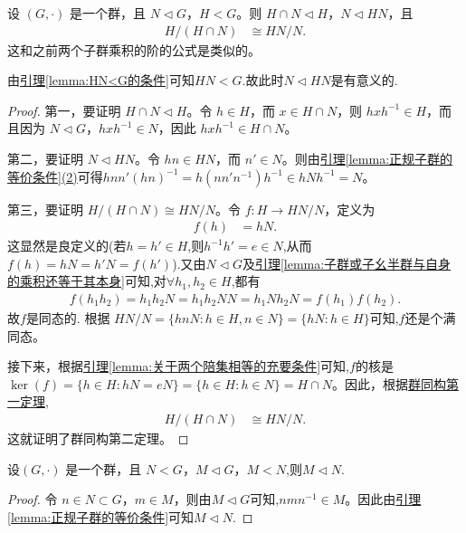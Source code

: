 \documentclass[../../main.tex]{subfiles}
\begin{document}
\begin{theorem}[群同构第二定理]\label{theorem:群同构第二定理}
设 \((G, \cdot)\) 是一个群，且 \(N \lhd G\)，\(H < G\)。则 \(H \cap N \lhd H\)，\(N \lhd HN\)，且
\begin{align*}
H/(H \cap N) &\cong HN/N .
\end{align*}
这和之前两个子群乘积的阶的公式是类似的。
\end{theorem}
\begin{remark}
由\hyperref[lemma:HN<G的条件]{引理\ref{lemma:HN<G的条件}}可知$HN<G$.故此时\(N \lhd HN\)是有意义的.
\end{remark}
\begin{proof}
第一，要证明 \(H \cap N \lhd H\)。令 \(h \in H\)，而 \(x \in H \cap N\)，则 \(hxh^{-1} \in H\)，而且因为 \(N \lhd G\)，\(hxh^{-1} \in N\)，因此 \(hxh^{-1} \in H \cap N\)。

第二，要证明 \(N \lhd HN\)。令 \(hn \in HN\)，而 \(n' \in N\)。则由\hyperref[lemma:正规子群的等价条件]{引理\ref{lemma:正规子群的等价条件}(2)}可得\(hnn'(hn)^{-1} = h(nn'n^{-1})h^{-1} \in hNh^{-1} = N\)。

第三，要证明 \(H/(H \cap N) \cong HN/N\)。令 \(f: H \to HN/N\)，定义为
\begin{align*}
f(h) &= hN .
\end{align*}
这显然是良定义的(若$h=h'\in H$,则$h^{-1}h'=e\in N$,从而$f(h)=hN=h'N=f(h')$).又由\(N \lhd G\)及\hyperref[lemma:子群或子幺半群与自身的乘积还等于其本身]{引理\ref{lemma:子群或子幺半群与自身的乘积还等于其本身}}可知,对$\forall h_1,h_2\in H$,都有
\begin{align*}
f\left( h_1h_2 \right) =h_1h_2N=h_1h_2NN=h_1Nh_2N=f\left( h_1 \right) f\left( h_2 \right) .
\end{align*}
故$f$是同态的.
根据 \(HN/N = \{hnN : h \in H, n \in N\} = \{hN : h \in H\}\)可知,$f$还是个满同态。

接下来，根据\hyperref[lemma:关于两个陪集相等的充要条件]{引理\ref{lemma:关于两个陪集相等的充要条件}}可知,$f$的核是 \(\ker(f) = \{h \in H : hN = eN\} = \{h \in H : h \in N\} = H \cap N\)。因此，根据\hyperref[theorem:群同构第一定理]{群同构第一定理},
\begin{align*}
H/(H \cap N) &\cong HN/N .
\end{align*}
这就证明了群同构第二定理。
\end{proof}

\begin{lemma}\label{lemma:正规子群的"传递性"}
设\((G, \cdot)\) 是一个群，且 \(N <G\)，\(M \lhd G\)，\(M < N\),则$M\lhd N.$ 
\end{lemma}
\begin{proof}
令 \(n \in N\subset G\)，\(m \in M\)，则由$M\lhd G$可知,\(nmn^{-1} \in M\)。因此由\hyperref[lemma:正规子群的等价条件]{引理\ref{lemma:正规子群的等价条件}}可知$M\lhd N$.
\end{proof}
\end{document}
